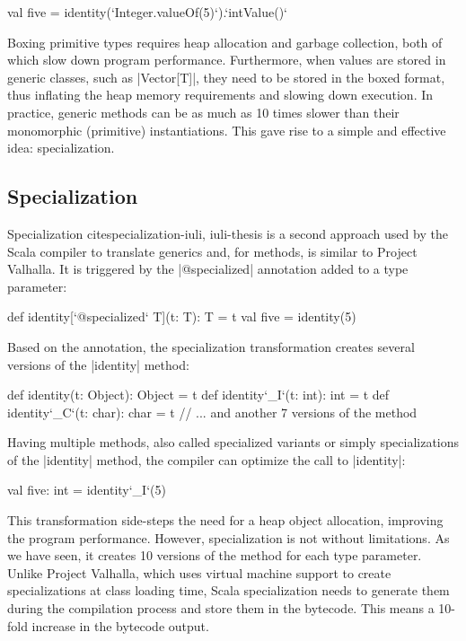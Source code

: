 \begin{lstlisting-nobreak}
 val five = identity(`Integer.valueOf(5)`).`intValue()`
\end{lstlisting-nobreak}

Boxing primitive types requires heap allocation and garbage collection, both of which slow down program performance. Furthermore, when values are stored in generic classes, such as |Vector[T]|, they need to be stored in the boxed format, thus inflating the heap memory requirements and slowing down execution. In practice, generic methods can be as much as 10 times slower than their monomorphic (primitive) instantiations. This gave rise to a simple and effective idea: specialization.

\subsection{Specialization}

Specialization cite{specialization-iuli, iuli-thesis} is a second approach used by the Scala compiler to translate generics and, for methods, is similar to Project Valhalla. It is triggered by the |@specialized| annotation added to a type parameter:

\begin{lstlisting-nobreak}
 def identity[`@specialized` T](t: T): T = t
 val five = identity(5)
\end{lstlisting-nobreak}

Based on the annotation, the specialization transformation creates several versions of the |identity| method:

\begin{lstlisting-nobreak}
 def identity(t: Object): Object = t
 def identity`_I`(t: int): int = t
 def identity`_C`(t: char): char = t
 // ... and another 7 versions of the method
\end{lstlisting-nobreak}

Having multiple methods, also called specialized variants or simply specializations of the |identity| method, the compiler can optimize the call to |identity|:

\begin{lstlisting-nobreak}
 val five: int = identity`_I`(5)
\end{lstlisting-nobreak}

This transformation side-steps the need for a heap object allocation, improving the program performance. However, specialization is not without limitations. As we have seen, it creates 10 versions of the method for each type parameter. Unlike Project Valhalla, which uses virtual machine support to create specializations at class loading time, Scala specialization needs to generate them during the compilation process and store them in the bytecode. This means a 10-fold increase in the bytecode output.

